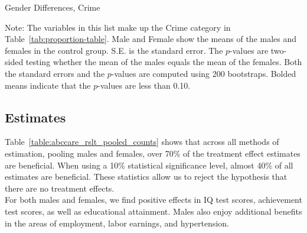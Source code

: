 \begin{table}
\centering
\caption{Gender Differences, Crime}\label{tab:tab1-crime}
\begin{adjustbox}{width=0.9\textwidth}
\begin{threeparttable}

\begin{tablenotes}
\footnotesize
\item Note: The variables in this list make up the Crime category in Table~\ref{tab:proportion-table}. Male and Female show the means of the males and females in the control group. S.E. is the standard error. The $p$-values are two-sided testing whether the mean of the males equals the mean of the females. Both the standard errors and the $p$-values are computed using 200 bootstraps. Bolded means indicate that the $p$-values are less than 0.10.
\end{tablenotes}
\end{threeparttable}
\end{adjustbox}
\end{table}

\subsection{Estimates} \label{appendix:estimates}

\noindent Table~\ref{table:abccare_rslt_pooled_counts} shows that across all methods of estimation, pooling males and females, over 70\% of the treatment effect estimates are beneficial. When using a 10\% statistical significance level, almost 40\% of all estimates are beneficial. These statistics allow us to reject the hypothesis that there are no treatment effects. \\

\noindent For both males and females, we find positive effects in IQ test scores, achievement test scores, as well as educational attainment. Males also enjoy additional benefits in the areas of employment, labor earnings, and hypertension. \\

